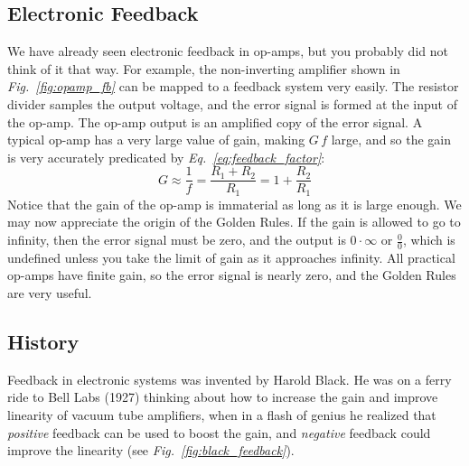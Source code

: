 \subsection{Electronic Feedback}
We have already seen electronic feedback in op-amps, but you probably did not think of it that way.  For example, the non-inverting amplifier shown in \emph{Fig.~\ref{fig:opamp_fb}} can be mapped to a feedback system very easily.  The resistor divider samples the output voltage, and the error signal is formed at the input of the op-amp.  The op-amp output is an amplified copy of the error signal.  A typical op-amp has a very large value of gain, making $G\,f$ large, and so the gain is very accurately predicated by \emph{Eq.~\ref{eq:feedback_factor}}:
    \begin{equation}
        G \approx \frac{1}{f} = \frac{R_1 + R_2}{R_1} = 1 + \frac{R_2}{R_1}
    \end{equation}
Notice that the gain of the op-amp is immaterial as long as it is large enough.  We may now appreciate the origin of the Golden Rules.  If the gain is allowed to go to infinity, then the error signal must be zero, and the output is $0 \cdot \infty$ or $\frac{0}{0}$, which is undefined unless you take the limit of gain as it approaches infinity.  All practical op-amps have finite gain, so the error signal is nearly zero, and the Golden Rules are very useful.  
\subsection{History}
Feedback in electronic systems was invented by Harold Black.  He was on a ferry ride to Bell Labs (1927) thinking about how to increase the gain and improve linearity of vacuum tube amplifiers, when in a flash of genius he realized that \textit{positive} feedback can be used to boost the gain, and \textit{negative} feedback could improve the linearity (see \emph{Fig.~\ref{fig:black_feedback}}).

